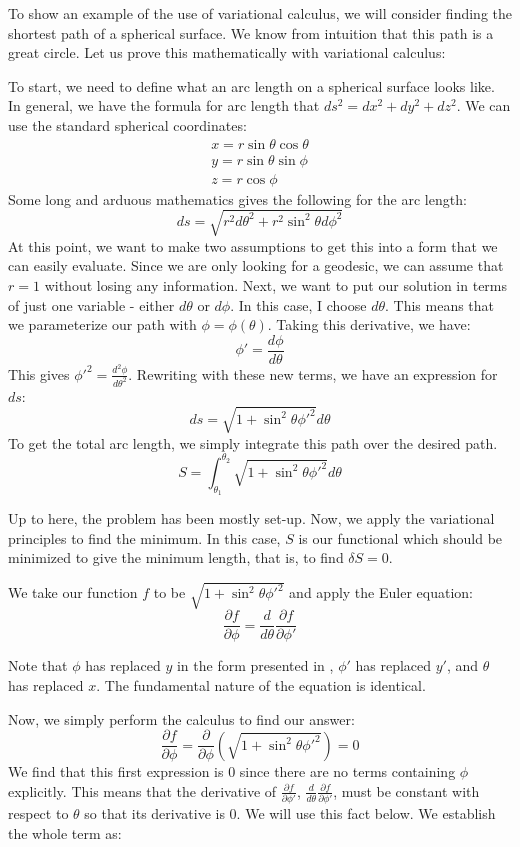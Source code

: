 \begin{example}\label{ex:geodesic}
To show an example of the use of variational calculus, we will consider finding the shortest path of a spherical surface. We know from intuition that this path is a great circle. Let us prove this mathematically with variational calculus:

To start, we need to define what an arc length on a spherical surface looks like. In general, we have the formula for arc length that $ds^2=dx^2+dy^2+dz^2$. We can use the standard spherical coordinates:
    $$\begin{array}{l}
        x=r\sin\theta\cos\theta\\
        y=r\sin\theta\sin\phi\\
        z=r\cos\phi
    \end{array}$$
Some long and arduous mathematics gives the following for the arc length:
$$ds=\sqrt{r^2d\theta^2+r^2\sin^2\theta d\phi^2}$$
At this point, we want to make two assumptions to get this into a form that we can easily evaluate. Since we are only looking for a \gls{geodesic}, we can assume that $r=1$ without losing any information. Next, we want to put our solution in terms of just one variable - either $d\theta$ or $d\phi$. In this case, I choose $d\theta$. This means that we parameterize our path with $\phi=\phi(\theta)$. Taking this derivative, we have:
$$\phi'=\frac{d\phi}{d\theta}$$
This gives ${\phi'}^2=\frac{d^2\phi}{d\theta^2}$. Rewriting with these new terms, we have an expression for $ds$:
$$ds=\sqrt{1+\sin^2\theta{\phi'}^2}d\theta$$
To get the total arc length, we simply integrate this path over the desired path.
$$S=\int_{\theta_1}^{\theta_2}{\sqrt{1+\sin^2\theta{\phi'}^2}d\theta}$$

Up to here, the problem has been mostly set-up. Now, we apply the variational principles to find the minimum. In this case, $S$ is our functional which should be minimized to give the minimum length, that is, to find $\delta S=0$.

We take our function $f$ to be $\sqrt{1+\sin^2\theta{\phi'}^2}$ and apply the Euler equation:
$$\frac{\partial f}{\partial \phi}=\frac{d}{d\theta}\frac{\partial f}{\partial \phi'}$$

Note that $\phi$ has replaced $y$ in the form presented in , $\phi'$ has replaced $y'$, and $\theta$ has replaced $x$. The fundamental nature of the equation is identical.

Now, we simply perform the calculus to find our answer:
$$\frac{\partial f}{\partial \phi}=\frac{\partial}{\partial\phi}\left(\sqrt{1+\sin^2\theta{\phi'}^2}\right)=0$$
We find that this first expression is 0 since there are no terms containing $\phi$ explicitly. This means that the derivative of $\frac{\partial f}{\partial \phi'}$, $\frac{d}{d\theta}\frac{\partial f}{\partial \phi'}$, must be constant with respect to $\theta$ so that its derivative is 0. We will use this fact below. We establish the whole term as:


\end{example}
